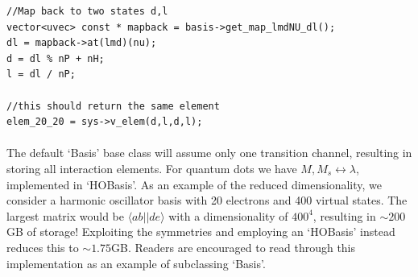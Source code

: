 \begin{lstlisting}[float,label={lst:qDots:mapBackward},caption={Continuing listing~\ref{lst:qDots:mapForward}, accessing the same element again, $\langle \nu || \nu \rangle_{\lambda} = \langle 20||20 \rangle$, now using the reverse mapping, $|\nu\rangle_{\lambda} \rightarrow |20\rangle$.},name={lst:qDots:map}]
//Map back to two states d,l
vector<uvec> const * mapback = basis->get_map_lmdNU_dl();
dl = mapback->at(lmd)(nu);
d = dl % nP + nH;
l = dl / nP;

//this should return the same element
elem_20_20 = sys->v_elem(d,l,d,l);
\end{lstlisting}

\paragraph*{}
The default `Basis' base class will assume only one transition channel, resulting in storing all interaction elements.
For quantum dots we have $M,M_s \leftrightarrow \lambda$, implemented in `HOBasis'.
As an example of the reduced dimensionality, we consider a harmonic oscillator basis with 20 electrons and 400 virtual states.
The largest matrix would be $\langle ab||de \rangle$ with a dimensionality of $400^4$, resulting in $\sim 200$GB of storage!
Exploiting the symmetries and employing an `HOBasis' instead reduces this to $\sim 1.75$GB.
Readers are encouraged to read through this implementation as an example of subclassing `Basis'.



